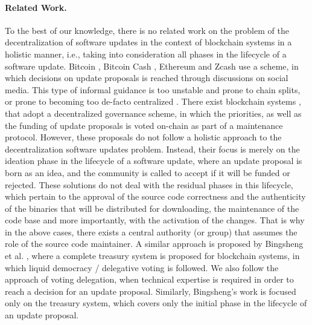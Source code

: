 \paragraph{Related Work.}
To the best of our knowledge, there is no related work on the problem of the decentralization of software updates in the context of blockchain systems in a holistic manner, i.e., taking into consideration all phases in the lifecycle of a software update.
Bitcoin \cite{bitcoin}, Bitcoin Cash \cite{bitcoincash}, Ethereum \cite{ethereum} and Zcash \cite{zerocash} use a  scheme, in which decisions on update proposals is reached through discussions on social media. This type of informal guidance is  too unstable and prone to chain splits, or prone to becoming too de-facto centralized \cite{buterin_on_gov}. There exist blockchain systems \cite{dash}, \cite{decred} that adopt a decentralized governance scheme, in which the priorities, as well as the funding of update proposals is voted on-chain as part of a maintenance protocol. However, these proposals do not follow a holistic approach to the decentralization software updates problem. Instead, their focus is merely on the ideation phase in the lifecycle of a software update, where an update proposal is born as an idea, and the community is called to accept if it will be funded or rejected. These solutions do not deal with the residual phases in this lifecycle, which pertain to the approval of the source code correctness and the authenticity of the binaries that will be distributed for downloading, the maintenance of the code base and more importantly, with the activation of the changes. That is why in the above cases, there exists a central authority (or group) that assumes the role of the source code maintainer. A similar approach is proposed by Bingsheng et al. \cite{treasury}, where a complete treasury system is proposed for blockchain systems, in which liquid democracy / delegative voting is followed. We also follow the approach of voting delegation, when technical expertise is required in order to reach a decision for an update proposal. Similarly, Bingsheng's work is focused only on the treasury system, which covers only the initial phase in the lifecycle of an update proposal.


%
